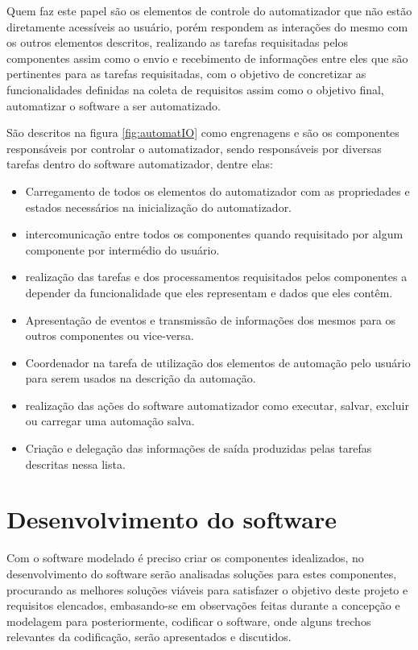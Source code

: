 \documentclass[tg]{mdtufsm}
\begin{document}
                    Quem faz este papel são os elementos de controle do automatizador que não estão diretamente acessíveis ao usuário, porém respondem as interações do mesmo com os outros elementos descritos, realizando as tarefas requisitadas pelos componentes assim como o envio e recebimento de informações entre eles que são pertinentes para as tarefas requisitadas, com o objetivo de concretizar as funcionalidades definidas na coleta de requisitos assim como o objetivo final, automatizar o software a ser automatizado.

                    São descritos na figura \ref{fig:automatIO} como engrenagens e são os componentes responsáveis por controlar o automatizador, sendo responsáveis por diversas tarefas dentro do software automatizador, dentre elas:

                    \begin{itemize}
                        \item Carregamento de todos os elementos do automatizador com as propriedades e estados necessários na inicialização do automatizador.
                        \item intercomunicação entre todos os componentes quando requisitado por algum componente por intermédio do usuário.
                        \item realização das tarefas e dos processamentos requisitados pelos componentes a depender da funcionalidade que eles representam e dados que eles contêm.
                        \item Apresentação de eventos e transmissão de informações dos mesmos para os outros componentes ou vice-versa.
                        \item Coordenador na tarefa de utilização dos elementos de automação pelo usuário para serem usados na descrição da automação.
                        \item realização das ações do software automatizador como executar, salvar, excluir ou carregar uma automação salva.
                        \item Criação e delegação das informações de saída produzidas pelas tarefas descritas nessa lista.
                    \end{itemize}

        \section {Desenvolvimento do software}

            Com o software modelado é preciso criar os componentes idealizados, no desenvolvimento do software serão analisadas soluções para estes componentes, procurando as melhores soluções viáveis para satisfazer o objetivo deste projeto e requisitos elencados, embasando-se em observações feitas durante a concepção e modelagem para posteriormente, codificar o software, onde alguns trechos relevantes da codificação, serão apresentados e discutidos.
\end{document}
